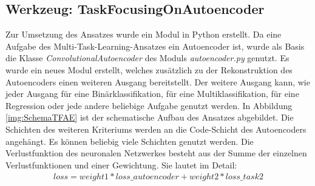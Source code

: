 	\subsection{Werkzeug: TaskFocusingOnAutoencoder}
	\label{subsec:SecondCriterionAutoenocder}
	Zur Umsetzung des Ansatzes wurde ein Modul in Python erstellt. Da eine Aufgabe des Multi-Task-Learning-Ansatzes ein Autoencoder ist, wurde als Basis die Klasse \textit{ConvolutionalAutoencoder} des Moduls \textit{autoencoder.py} genutzt. Es wurde ein neues Modul erstellt, welches zusätzlich zu der Rekonstruktion des Autoencoders einen weiteren Ausgang bereitstellt. Der weitere Ausgang kann, wie jeder Ausgang für eine Binärklassifikation, für eine Multiklassifikation, für eine Regression oder jede andere beliebige Aufgabe genutzt werden. In Abbildung \ref{img:SchemaTFAE} ist der schematische Aufbau des Ansatzes abgebildet. Die Schichten des weiteren Kriteriums werden an die Code-Schicht des Autoencoders angehängt. Es können beliebig viele Schichten genutzt werden. Die Verlustfunktion des neuronalen Netzwerkes besteht aus der Summe der einzelnen Verlustfunktionen und einer Gewichtung. Sie lautet im Detail: 
	\begin{align}
	loss = weight1 * loss\_autoencoder + weight2 * loss\_task2
	\end{align}

